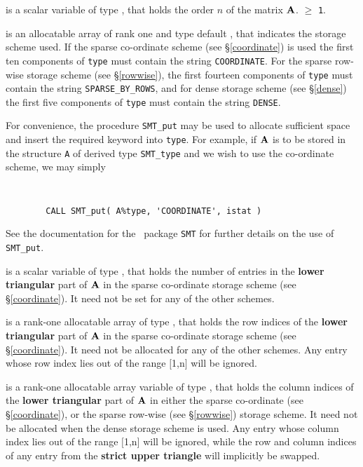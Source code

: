 \documentclass{galahad}
\begin{document}
\begin{description}

 is a scalar variable of type \integer, that holds
the order $n$ of the matrix  ${\mathbf{A}}$.
 $\geq$ {\tt 1}.

 is an allocatable array of rank one and type default \character, that
indicates the storage scheme used. If the
sparse co-ordinate scheme (see \S\ref{coordinate}) is used
the first ten components of {\tt type} must contain the
string {\tt COORDINATE}.
For the sparse row-wise storage scheme (see \S\ref{rowwise}),
the first fourteen components of {\tt type} must contain the
string {\tt SPARSE\_BY\_ROWS}, and
for dense storage scheme (see \S\ref{dense})
the first five components of {\tt type} must contain the
string {\tt DENSE}.

For convenience, the procedure {\tt SMT\_put}
may be used to allocate sufficient space and insert the required keyword
into {\tt type}.
For example, if ${\mathbf{A}}$ is to be stored in the structure {\tt A}
of derived type {\tt SMT\_type} and we wish to use
the co-ordinate scheme, we may simply
{\tt
\begin{verbatim}
        CALL SMT_put( A%type, 'COORDINATE', istat )
\end{verbatim}
}
\noindent
See the documentation for the \galahad\ package {\tt SMT}
for further details on the use of {\tt SMT\_put}.

 is a scalar variable of type \integer, that
holds the number of entries in the {\bf lower triangular} part of ${\mathbf{A}}$
in the sparse co-ordinate storage scheme (see \S\ref{coordinate}).
It need not be set for any of the other schemes.

 is a rank-one allocatable array of type \integer,
that holds the row indices of the {\bf lower triangular} part of ${\mathbf{A}}$
in the sparse co-ordinate storage
scheme (see \S\ref{coordinate}).
It need not be allocated for any of the other schemes.
Any entry whose row index lies out of the range $[$1,n$]$ will be ignored.

 is a rank-one allocatable array variable of type \integer,
that holds the column indices of the {\bf lower triangular} part of
${\mathbf{A}}$ in either the sparse co-ordinate
(see \S\ref{coordinate}), or the sparse row-wise
(see \S\ref{rowwise}) storage scheme.
It need not be allocated when the dense
storage scheme is used.
Any entry whose column index lies out of the range $[$1,n$]$ will be ignored,
while the row and column indices of any entry from the
{\bf strict upper triangle} will implicitly be swapped.


\end{description}
\end{document}
